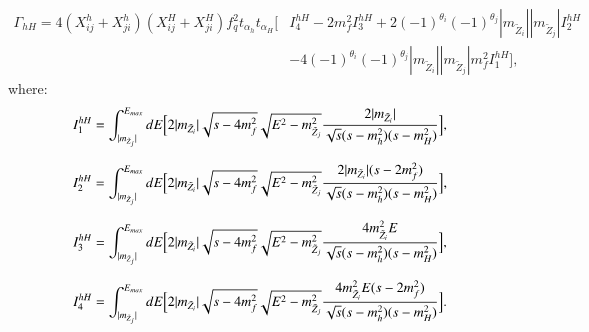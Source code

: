 \documentclass[final,3p,times,pdflatex]{elsarticle}
\begin{document}
\begin{equation}
\begin{aligned}
\Gamma_{hH} = 4(X_{ij}^h + X_{ji}^h)(X_{ij}^H + X_{ji}^H)f_{q}^2 t_{\alpha_h} t_{\alpha_H} \Big[ & I_{4}^{hH} - 2m_{f}^2I_{3}^{hH} + 2(-1)^{\theta_i}(-1)^{\theta_j}|m_{\tilde{Z}_i}||m_{\tilde{Z}_j}|I_{2}^{hH} \\ & - 4(-1)^{\theta_i}(-1)^{\theta_j}|m_{\tilde{Z}_i}||m_{\tilde{Z}_j}|m_{f}^2 I_{1}^{hH} \Big],
\end{aligned}
\end{equation}
where:
\begin{equation}
I_{1}^{hH} = \int_{|m_{\tilde{Z}_j}|}^{E_{max}} dE \Big[2|m_{\tilde{Z}_i}|\sqrt{s-4m_{f}^2}\sqrt{E^2 - m_{\tilde{Z}_j}^2} {2|m_{\tilde{Z}_i}| \over \sqrt{s}(s-m_{h}^2)(s-m_{H}^2)}\Big],
\end{equation}

\begin{equation}
I_{2}^{hH} = \int_{|m_{\tilde{Z}_j}|}^{E_{max}} dE \Big[2|m_{\tilde{Z}_i}|\sqrt{s-4m_{f}^2}\sqrt{E^2 - m_{\tilde{Z}_j}^2} {2|m_{\tilde{Z}_i}| (s-2m_{f}^2) \over \sqrt{s}(s-m_{h}^2)(s-m_{H}^2)}\Big],
\end{equation}

\begin{equation}
I_{3}^{hH} = \int_{|m_{\tilde{Z}_j}|}^{E_{max}} dE \Big[2|m_{\tilde{Z}_i}|\sqrt{s-4m_{f}^2}\sqrt{E^2 - m_{\tilde{Z}_j}^2} {4m_{\tilde{Z}_i}^2 E \over \sqrt{s}(s-m_{h}^2)(s-m_{H}^2)}\Big],
\end{equation}

\begin{equation}
I_{4}^{hH} = \int_{|m_{\tilde{Z}_j}|}^{E_{max}} dE \Big[2|m_{\tilde{Z}_i}|\sqrt{s-4m_{f}^2}\sqrt{E^2 - m_{\tilde{Z}_j}^2} {4m_{\tilde{Z}_i}^2 E (s-2m_{f}^2) \over \sqrt{s}(s-m_{h}^2)(s-m_{H}^2)}\Big].	
\end{equation}
\end{document}
